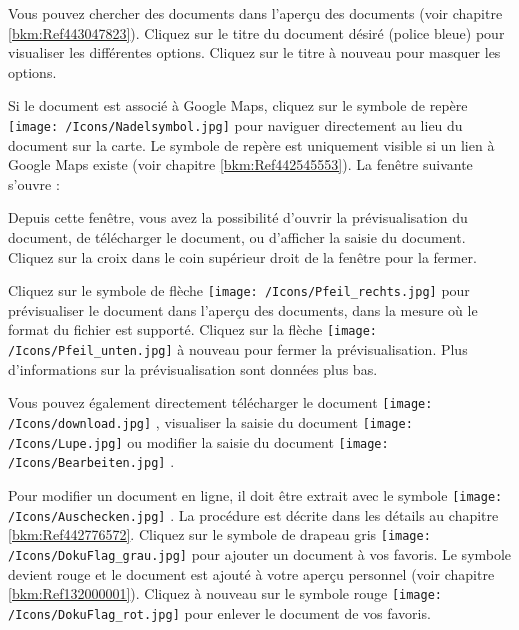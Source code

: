 Vous pouvez chercher des documents dans l'aperçu des documents (voir chapitre \ref{bkm:Ref443047823}). Cliquez sur le titre du document désiré (police bleue)  pour visualiser les différentes options. Cliquez sur le titre à nouveau pour masquer les options.

Si le document est associé à Google Maps, cliquez sur le symbole de repère \texttt{[image: /Icons/Nadelsymbol.jpg]}  pour naviguer directement au lieu du document sur la carte. Le symbole de repère est uniquement visible si un lien à Google Maps existe (voir chapitre \ref{bkm:Ref442545553}). La fenêtre suivante s'ouvre :

\begin{figure}[H]
\end{figure}

Depuis cette fenêtre, vous avez la possibilité d'ouvrir la prévisualisation du document, de télécharger le document, ou d'afficher la saisie du document. Cliquez sur la croix dans le coin supérieur droit de la fenêtre pour la fermer. \newline

Cliquez sur le symbole de flèche \texttt{[image: /Icons/Pfeil\_rechts.jpg]}  pour prévisualiser le document dans l'aperçu des documents, dans la mesure où le format du fichier est supporté. Cliquez sur la flèche \texttt{[image: /Icons/Pfeil\_unten.jpg]} à nouveau pour fermer la prévisualisation. Plus d'informations sur la prévisualisation sont données plus bas.\newline

Vous pouvez également directement télécharger le document \texttt{[image: /Icons/download.jpg]} , visualiser la saisie du document \texttt{[image: /Icons/Lupe.jpg]}  ou modifier la saisie du document \texttt{[image: /Icons/Bearbeiten.jpg]} . \newline

Pour modifier un document en ligne, il doit être extrait avec le symbole \texttt{[image: /Icons/Auschecken.jpg]} . La procédure est décrite dans les détails au chapitre \ref{bkm:Ref442776572}. Cliquez sur le symbole de drapeau gris \texttt{[image: /Icons/DokuFlag\_grau.jpg]}  pour ajouter un document à vos favoris. Le symbole devient rouge et le document est ajouté à votre aperçu personnel (voir chapitre \ref{bkm:Ref132000001}). Cliquez à nouveau sur le symbole rouge \texttt{[image: /Icons/DokuFlag\_rot.jpg]} pour enlever le document de vos favoris. \newline


